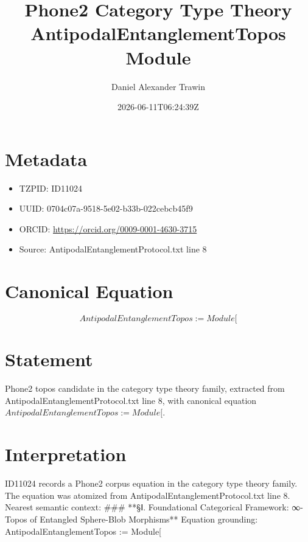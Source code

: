 \documentclass[11pt]{article}
\title{Phone2 Category Type Theory AntipodalEntanglementTopos Module}
\author{Daniel Alexander Trawin}
\date{2026-06-11T06:24:39Z}
\begin{document}
\maketitle
\section*{Metadata}
\begin{itemize}
\item TZPID: ID11024
\item UUID: 0704c07a-9518-5e02-b33b-022cebcb45f9
\item ORCID: \url{https://orcid.org/0009-0001-4630-3715}
\item Source: AntipodalEntanglementProtocol.txt line 8
\end{itemize}
\section*{Canonical Equation}
\[
AntipodalEntanglementTopos := Module[
\]
\section*{Statement}
Phone2 topos candidate in the category type theory family, extracted from AntipodalEntanglementProtocol.txt line 8, with canonical equation $AntipodalEntanglementTopos := Module[$.
\section*{Interpretation}
ID11024 records a Phone2 corpus equation in the category type theory family. The equation was atomized from AntipodalEntanglementProtocol.txt line 8. Nearest semantic context: ### **§Ⅰ. Foundational Categorical Framework: ∞-Topos of Entangled Sphere-Blob Morphisms** Equation grounding: AntipodalEntanglementTopos := Module[
\end{document}
